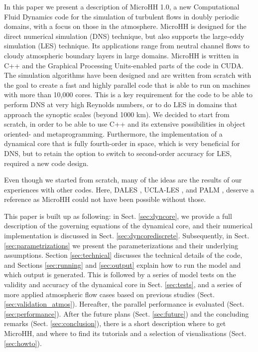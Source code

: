 \documentclass[gmd,manuscript]{copernicus}
\begin{document}
\introduction  %
In this paper we present a description of MicroHH 1.0, a new Computational Fluid Dynamics code for the simulation of turbulent flows in doubly periodic domains, with a focus on those in the atmosphere. MicroHH is designed for the direct numerical simulation (DNS) technique, but also supports the large-eddy simulation (LES) technique. Its applications range from neutral channel flows to cloudy atmospheric boundary layers in large domains. MicroHH is written in C++ and the Graphical Processing Units-enabled parts of the code in CUDA. The simulation algorithms have been designed and are written from scratch with the goal to create a fast and highly parallel code that is able to run on machines with more than 10,000 cores. This is a key requirement for the code to be able to perform DNS at very high Reynolds numbers, or to do LES in domains that approach the synoptic scales (beyond 1000 km). We decided to start from scratch, in order to be able to use C++ and its extensive possibilities in object oriented- and metaprogramming. Furthermore, the implementation of a dynamical core that is fully fourth-order in space, which is very beneficial for DNS, but to retain the option to switch to second-order accuracy for LES, required a new code design.

Even though we started from scratch, many of the ideas are the results of our experiences with other codes. Here, DALES \citep{Heus2010}, UCLA-LES \citep{Stevens2005}, and PALM \citep{Maronga2015}, deserve a reference as MicroHH could not have been possible without those.

This paper is built up as following: in Sect. \ref{sec:dyncore}, we provide a full description of the governing equations of the dynamical core, and their numerical implementation is discussed in Sect. \ref{sec:dyncorediscrete}. Subsequently, in Sect. \ref{sec:parametrizations} we present the parameterizations and their underlying assumptions. Section \ref{sec:technical} discusses the technical details of the code, and Sections \ref{sec:running} and \ref{sec:output} explain how to run the model and which output is generated. This is followed by a series of model tests on the validity and accuracy of the dynamical core in Sect. \ref{sec:tests}, and a series of more applied atmospheric flow cases based on previous studies (Sect. \ref{sec:validation_atmos}). Hereafter, the parallel performance is evaluated (Sect. \ref{sec:performance}). After the  future plans (Sect. \ref{sec:future}) and the concluding remarks (Sect. \ref{sec:conclusion}), there is a short description where to get MicroHH, and where to find its tutorials and a selection of visualisations (Sect. \ref{sec:howto}).
\end{document}
